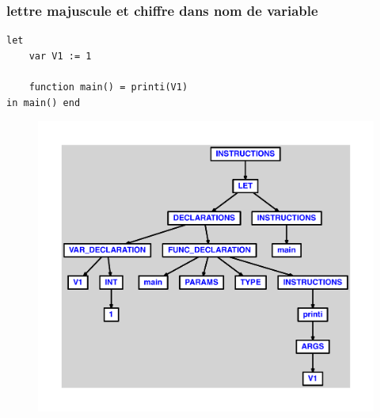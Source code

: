 \documentclass{article}
\begin{document}
\subsubsection{lettre majuscule et chiffre dans nom de variable}
\begin{lstlisting}
let
	var V1 := 1

	function main() = printi(V1)
in main() end
\end{lstlisting}
\newpage
\begin{figure}[H]
\centering
\includegraphics[max width=\textwidth]{ast/ast_318.pdf}
\end{figure}
\newpage
\end{document}
